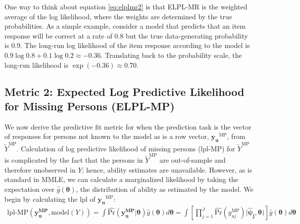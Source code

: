 \documentclass[
  english,
  man,floatsintext]{apa7}
\begin{document}
One way to think about equation \ref{eq:elplmr2} is that ELPL-MR is the weighted average of the log likelihood, where the weights are determined by the true probabilities. As a simple example, consider a model that predicts that an item response will be correct at a rate of \(0.8\) but the true data-generating probability is \(0.9\). The long-run log likelihood of the item response according to the model is \(0.9 \log 0.8 + 0.1 \log 0.2 \approx -0.36\). Translating back to the probability scale, the long-run likelihood is \(\exp(-0.36) \approx 0.70\).

\hypertarget{metric-2-expected-log-predictive-likelihood-for-missing-persons-elpl-mp}{%
\subsection{Metric 2: Expected Log Predictive Likelihood for Missing Persons (ELPL-MP)}\label{metric-2-expected-log-predictive-likelihood-for-missing-persons-elpl-mp}}

We now derive the predictive fit metric for when the prediction task is the vector of responses for persons not known to the model as is a row vector, \(\bm{y_u}^{\text{MP}}\), from \(\tilde Y^{\text{MP}}\). Calculation of log predictive likelihood of missing persons (lpl-MP) for \(\tilde Y^{\text{MP}}\) is complicated by the fact that the persons in \(\tilde Y^{\text{MP}}\) are out-of-sample and therefore unobserved in \(Y\); hence, ability estimates are unavailable. However, as is standard in MMLE, we can calculate a marginalized likelihood by taking the expectation over \(\hat g(\bm{\theta})\), the distribution of ability as estimated by the model. We begin by calculating the lpl of \(\bm{y_u}^{\text{MP}}\):
\begin{align}
\text{lpl-MP}(\bm{y_u^\text{MP}}, \text{model}(Y)) = \int \hat{\text{Pr}}(\bm{y_u^\text{MP}}|\bm{\theta}) \hat g(\bm{\theta}) d\bm{\theta} = \int \left[\prod_{j=1}^{J} \hat{\text{Pr}}(y_{uj}^\text{MP}) | \bm{\hat\psi_j}, \bm{\theta}) \right] \hat g(\bm{\theta}) d\bm{\theta}
\end{align}
\end{document}
